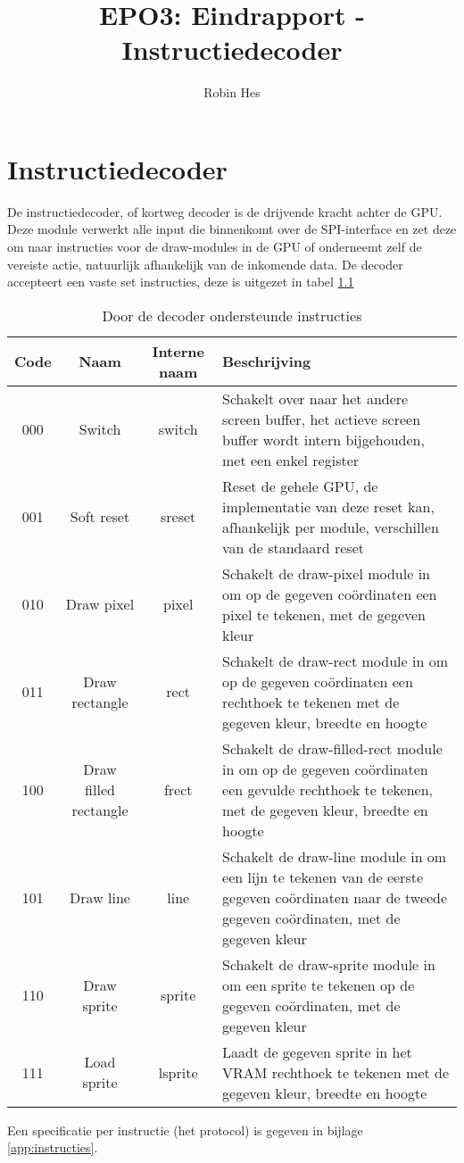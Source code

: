 \documentclass{scrartcl} %
\title{EPO3: Eindrapport - Instructiedecoder}
\author{Robin Hes}
\begin{document}
\chapter{Instructiedecoder}
\label{ch:decoder}

De instructiedecoder, of kortweg decoder is de drijvende kracht achter de GPU. Deze module verwerkt alle input die binnenkomt over de SPI-interface en zet deze om naar instructies voor de draw-modules in de GPU of onderneemt zelf de vereiste actie, natuurlijk afhankelijk van de inkomende data. De decoder accepteert een vaste set instructies, deze is uitgezet in tabel \ref{tab:decoder-instruction}

\begin{table}[H]
	\centering
	\caption{Door de decoder ondersteunde instructies}
	\label{tab:decoder-instruction}
	\begin{tabular}{c c c p{}}
		\hline\hline
		Code & Naam & Interne naam & Beschrijving \\
		\hline
		000 & Switch & switch & Schakelt over naar het andere screen buffer, het actieve screen buffer wordt intern bijgehouden, met een enkel register \\
		001 & Soft reset & sreset & Reset de gehele GPU, de implementatie van deze reset kan, afhankelijk per module, verschillen van de standaard reset \\
		010 & Draw pixel & pixel & Schakelt de draw-pixel module in om op de gegeven coördinaten een pixel te tekenen, met de gegeven kleur \\
		011 & Draw rectangle & rect & Schakelt de draw-rect module in om op de gegeven coördinaten een rechthoek te tekenen met de gegeven kleur, breedte en hoogte \\
		100 & Draw filled rectangle & frect & Schakelt de draw-filled-rect module in om op de gegeven coördinaten een gevulde rechthoek te tekenen, met de gegeven kleur, breedte en hoogte \\
		101 & Draw line & line & Schakelt de draw-line module in om een lijn te tekenen van de eerste gegeven coördinaten naar de tweede gegeven coördinaten, met de gegeven kleur \\
		110 & Draw sprite & sprite & Schakelt de draw-sprite module in om een sprite te tekenen op de gegeven coördinaten, met de gegeven kleur \\
		111 & Load sprite & lsprite & Laadt de gegeven sprite in het VRAM rechthoek te tekenen met de gegeven kleur, breedte en hoogte \\
		\end{tabular}
\end{table}
\small
Een specificatie per instructie (het protocol) is gegeven in bijlage \ref{app:instructies}.
\end{document}

